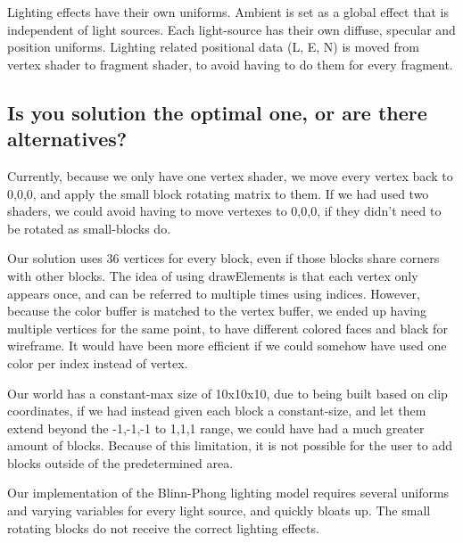Lighting effects have their own uniforms. 
Ambient is set as a global effect that is independent of light sources.
Each light-source has their own diffuse, specular and position uniforms.
Lighting related positional data (L, E, N) is moved from vertex shader to fragment shader, 
to avoid having to do them for every fragment.

\subsection{Is you solution the optimal one, or are there alternatives?}

Currently, because we only have one vertex shader, we move every vertex back to 0,0,0, and apply the small block rotating matrix to them.
If we had used two shaders, we could avoid having to move vertexes to 0,0,0, if they didn't need to be rotated as small-blocks do.

Our solution uses 36 vertices for every block, even if those blocks share corners with other blocks.
The idea of using drawElements is that each vertex only appears once, 
and can be referred to multiple times using indices.
However, because the color buffer is matched to the vertex buffer, 
we ended up having multiple vertices for the same point, 
to have different colored faces and black for wireframe.
It would have been more efficient if we could somehow have used one color per index instead of vertex.

Our world has a constant-max size of 10x10x10, due to being built based on clip coordinates, 
if we had instead given each block a constant-size, and let them extend beyond the -1,-1,-1 to 1,1,1 range, 
we could have had a much greater amount of blocks. Because of this limitation, it is not possible for the user to add blocks outside of the predetermined area.

Our implementation of the Blinn-Phong lighting model requires several uniforms and varying variables for every light source, and quickly bloats up.
The small rotating blocks do not receive the correct lighting effects.